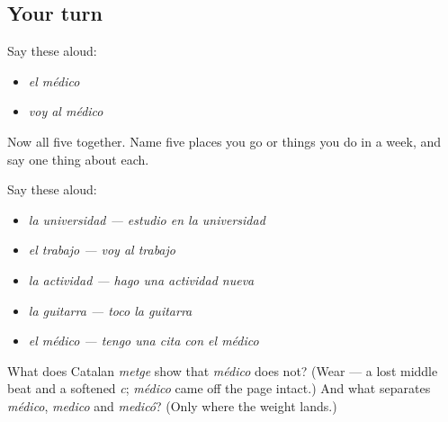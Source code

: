 \subsection*{Your turn}
Say these aloud:

\begin{itemize}
\raggedright
  \item \emph{el médico}
  \item \emph{voy al médico}
\end{itemize}

Now all five together. Name five places you go or things you do in a week, and say one thing about each.

Say these aloud:

\begin{itemize}
\raggedright
  \item \emph{la universidad — estudio en la universidad}
  \item \emph{el trabajo — voy al trabajo}
  \item \emph{la actividad — hago una actividad nueva}
  \item \emph{la guitarra — toco la guitarra}
  \item \emph{el médico — tengo una cita con el médico}
\end{itemize}

\begin{tcolorbox}[breakable,colback=teal!4,colframe=teal!35!black,title={Before you move on}]
What does Catalan \emph{metge} show that \emph{médico} does not? (Wear — a lost middle beat and a softened \emph{c}; \emph{médico} came off the page intact.) And what separates \emph{médico}, \emph{medico} and \emph{medicó}? (Only where the weight lands.)
\end{tcolorbox}
